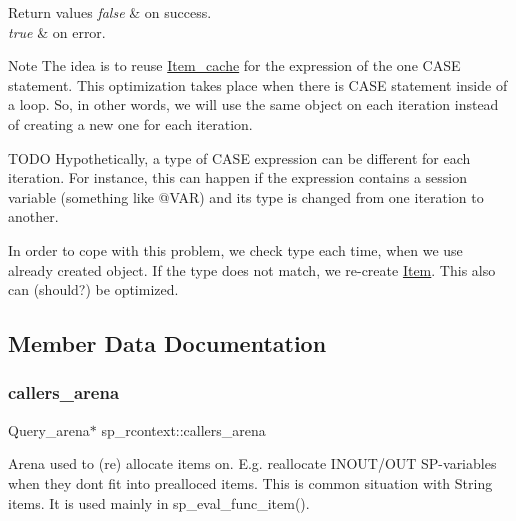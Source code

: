 \begin{DoxyRetVals}{Return values}
{\em false} & on success. \\
\hline
{\em true} & on error.\\
\hline
\end{DoxyRetVals}
\begin{DoxyNote}{Note}
The idea is to reuse \mbox{\hyperlink{classItem__cache}{Item\+\_\+cache}} for the expression of the one C\+A\+SE statement. This optimization takes place when there is C\+A\+SE statement inside of a loop. So, in other words, we will use the same object on each iteration instead of creating a new one for each iteration.
\end{DoxyNote}
T\+O\+DO Hypothetically, a type of C\+A\+SE expression can be different for each iteration. For instance, this can happen if the expression contains a session variable (something like @V\+AR) and its type is changed from one iteration to another.

In order to cope with this problem, we check type each time, when we use already created object. If the type does not match, we re-\/create \mbox{\hyperlink{classItem}{Item}}. This also can (should?) be optimized. 

\subsection{Member Data Documentation}
\mbox{\label{classsp__rcontext_a01627fcdc799ecada127641cb3afe497}} 
\subsubsection{\texorpdfstring{callers\+\_\+arena}{callers\_arena}}
{\footnotesize\ttfamily Query\+\_\+arena$\ast$ sp\+\_\+rcontext\+::callers\+\_\+arena}

Arena used to (re) allocate items on. E.\+g. reallocate I\+N\+O\+U\+T/\+O\+UT SP-\/variables when they don\textquotesingle{}t fit into prealloced items. This is common situation with String items. It is used mainly in sp\+\_\+eval\+\_\+func\+\_\+item(). \mbox{\label{classsp__rcontext_ad25037c2c9c6e01ec67c2b19f9cdd7b8}} 
